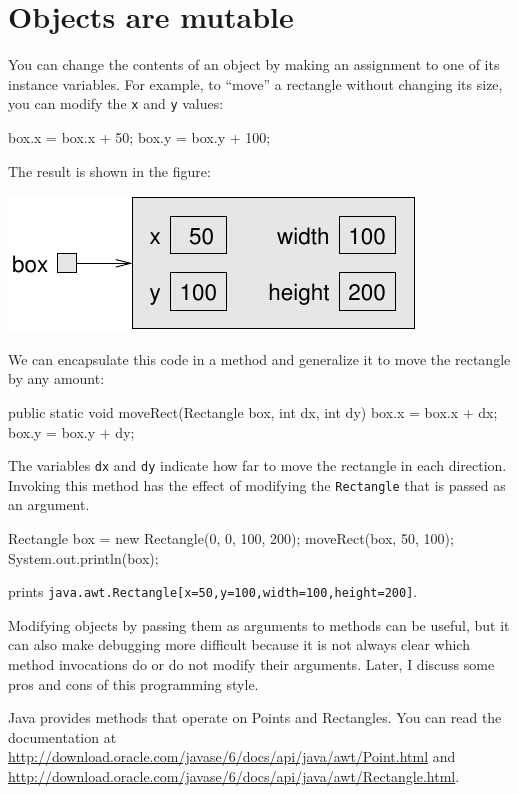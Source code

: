 \section{Objects are mutable}

You can change the contents of an object by making an assignment
to one of its instance variables.  For example, to ``move''
a rectangle without changing its size, you can modify the
{\tt x} and {\tt y} values:

\begin{code}
    box.x = box.x + 50;
    box.y = box.y + 100;
\end{code}
%
The result is shown in the figure:


\includegraphics{figs/rectangle2.pdf}



We can encapsulate this code in a method and
generalize it to move the rectangle by any amount:

\begin{code}
  public static void moveRect(Rectangle box, int dx, int dy) {
    box.x = box.x + dx;
    box.y = box.y + dy;
  }
\end{code}
%
The variables {\tt dx} and {\tt dy} indicate how far to move the
rectangle in each direction.  Invoking this method has the effect of
modifying the {\tt Rectangle} that is passed as an argument.

\begin{code}
    Rectangle box = new Rectangle(0, 0, 100, 200);
    moveRect(box, 50, 100);
    System.out.println(box);
\end{code}
%
prints {\tt java.awt.Rectangle[x=50,y=100,width=100,height=200]}.

Modifying objects by passing them as arguments to methods can be
useful, but it can also make debugging more difficult because it is
not always clear which method invocations do or do not modify their
arguments.  Later, I discuss some pros and cons of this
programming style.

Java provides methods that operate on Points and Rectangles.  You can
read the documentation at
\url{http://download.oracle.com/javase/6/docs/api/java/awt/Point.html}
and
\url{http://download.oracle.com/javase/6/docs/api/java/awt/Rectangle.html}.

